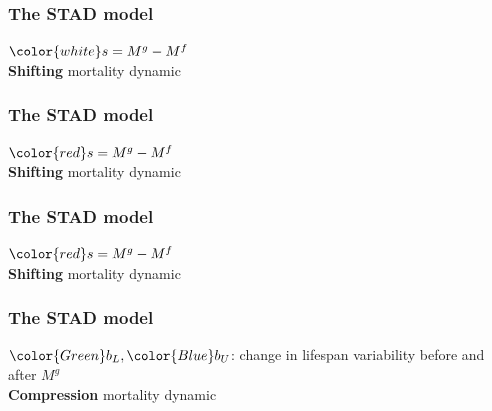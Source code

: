 \documentclass[12pt, xcolor=table]{beamer}  %
\begin{document}
\begin{frame}\frametitle{The STAD model}
\begin{center}
\vspace{-0.1cm}
{\color{white}${\color{white}s}=M^g - M^f$ \\
\textbf{Shifting} mortality dynamic} \\
\end{center}

\end{frame}

\begin{frame}[noframenumbering]\frametitle{The STAD model}
\begin{center}
\vspace{-0.1cm}
${\color{red}s}=M^g - M^f$ \\
\textbf{Shifting} mortality dynamic \\
\end{center}

\end{frame}

\begin{frame}[noframenumbering]\frametitle{The STAD model}
\begin{center}
\vspace{-0.1cm}
${\color{red}s}=M^g - M^f$ \\
\textbf{Shifting} mortality dynamic \\
\end{center}

\end{frame}


\begin{frame}\frametitle{The STAD model}
\begin{center}
\vspace{-0.1cm}
${\color{Green}b_L} , {\color{Blue}b_U}$: change in lifespan variability before and after $M^g$ \\
\textbf{Compression} mortality dynamic \\
\end{center}

\end{frame}
\end{document}
